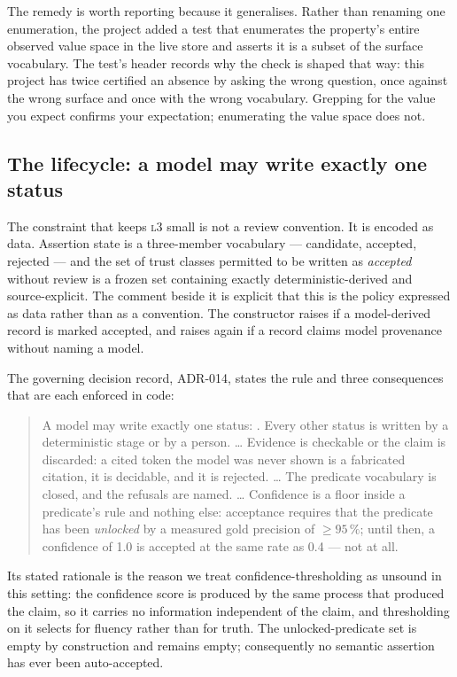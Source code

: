 The remedy is worth reporting because it generalises. Rather than renaming one
enumeration, the project added a test that enumerates the property's entire observed
value space in the live store and asserts it is a subset of the surface vocabulary.
The test's header records why the check is shaped that way: this project has twice
certified an absence by asking the wrong question, once against the wrong surface and
once with the wrong vocabulary. Grepping for the value you expect confirms your
expectation; enumerating the value space does not.

\subsection{The lifecycle: a model may write exactly one status}
\label{sec:model-policy}

The constraint that keeps \textsc{l3} small is not a review convention. It is encoded
as data. Assertion state is a three-member vocabulary --- candidate, accepted,
rejected --- and the set of trust classes permitted to be written as \emph{accepted}
without review is a frozen set containing exactly deterministic-derived and
source-explicit. The comment beside it is explicit that this is the policy expressed
as data rather than as a convention. The constructor raises if a model-derived record
is marked accepted, and raises again if a record claims model provenance without
naming a model.

The governing decision record, \mbox{ADR-014}, states the rule and three consequences
that are each enforced in code:

\begin{quote}\small
A model may write exactly one status: . Every other status is written
by a deterministic stage or by a person. \dots{} Evidence is checkable or the claim is
discarded: a cited token the model was never shown is a fabricated citation, it is
decidable, and it is rejected. \dots{} The predicate vocabulary is closed, and the
refusals are named. \dots{} Confidence is a floor inside a predicate's rule and
nothing else: acceptance requires that the predicate has been \emph{unlocked} by a
measured gold precision of $\ge 95\,\%$; until then, a confidence of 1.0 is accepted at
the same rate as 0.4 --- not at all.
\end{quote}

Its stated rationale is the reason we treat confidence-thresholding as unsound in this
setting: the confidence score is produced by the same process that produced the claim,
so it carries no information independent of the claim, and thresholding on it selects
for fluency rather than for truth. The unlocked-predicate set is empty by
construction and remains empty; consequently no semantic assertion has ever been
auto-accepted.

